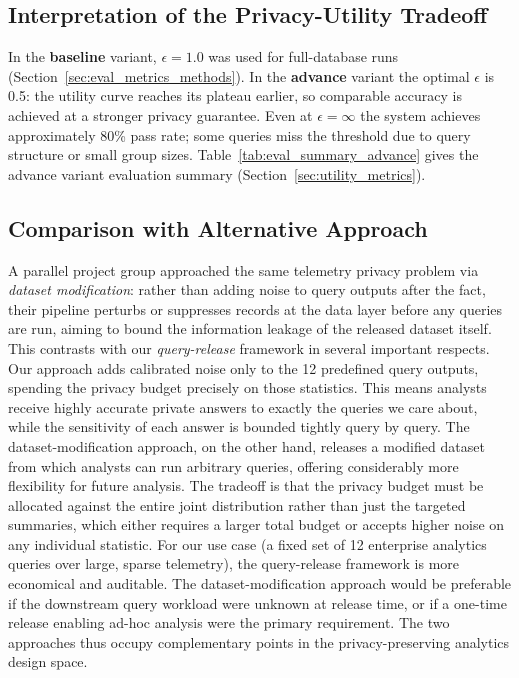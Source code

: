 \documentclass[12pt,letterpaper]{article}
\begin{document}
\subsection{Interpretation of the Privacy-Utility Tradeoff}
\label{sec:disc_interpretation}

In the \textbf{baseline} variant, $\epsilon = 1.0$ was used for full-database runs (Section~\ref{sec:eval_metrics_methods}). In the \textbf{advance} variant the optimal $\epsilon$ is 0.5: the utility curve reaches its plateau earlier, so comparable accuracy is achieved at a stronger privacy guarantee. Even at $\epsilon = \infty$ the system achieves approximately 80\% pass rate; some queries miss the threshold due to query structure or small group sizes. Table~\ref{tab:eval_summary_advance} gives the advance variant evaluation summary (Section~\ref{sec:utility_metrics}).

\subsection{Comparison with Alternative Approach}
\label{sec:disc_comparison}

A parallel project group approached the same telemetry privacy problem via \emph{dataset modification}: rather than adding noise to query outputs after the fact, their pipeline perturbs or suppresses records at the data layer before any queries are run, aiming to bound the information leakage of the released dataset itself. This contrasts with our \emph{query-release} framework in several important respects. Our approach adds calibrated noise only to the 12 predefined query outputs, spending the privacy budget precisely on those statistics. This means analysts receive highly accurate private answers to exactly the queries we care about, while the sensitivity of each answer is bounded tightly query by query. The dataset-modification approach, on the other hand, releases a modified dataset from which analysts can run arbitrary queries, offering considerably more flexibility for future analysis. The tradeoff is that the privacy budget must be allocated against the entire joint distribution rather than just the targeted summaries, which either requires a larger total budget or accepts higher noise on any individual statistic. For our use case (a fixed set of 12 enterprise analytics queries over large, sparse telemetry), the query-release framework is more economical and auditable. The dataset-modification approach would be preferable if the downstream query workload were unknown at release time, or if a one-time release enabling ad-hoc analysis were the primary requirement. The two approaches thus occupy complementary points in the privacy-preserving analytics design space.
\end{document}
